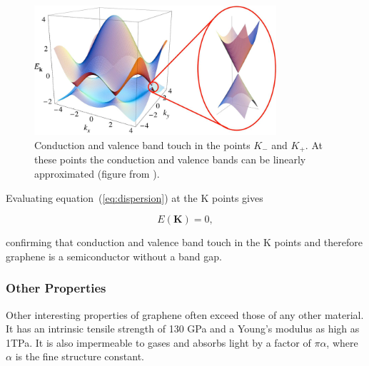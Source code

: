 \begin{figure}[!h]
  \centering
  \includegraphics[width=0.8\textwidth]{./images/dispersion.png}
  \caption { Conduction and valence band touch in the points $K_-$ and $K_+$. At these points the conduction and valence bands can be linearly approximated (figure from \cite{graphene}). }
  \label{fig:bands}
\end{figure}

Evaluating equation~(\ref{eq:dispersion}) at the K points gives

\begin{equation}
  E(\mathbf{K})=0,
\end{equation}

confirming that conduction and valence band touch in the K points and therefore graphene is a semiconductor without a band gap.

\subsubsection{Other Properties}

Other interesting properties of graphene often exceed those of any other material. It has an intrinsic tensile strength of 130 GPa and a Young's modulus as high as 1TPa\cite{strength}. It is also impermeable to gases\cite{Bunch2008} and absorbs light by a factor of $\pi\alpha$\cite{optical}, where $\alpha$ is the fine structure constant.
